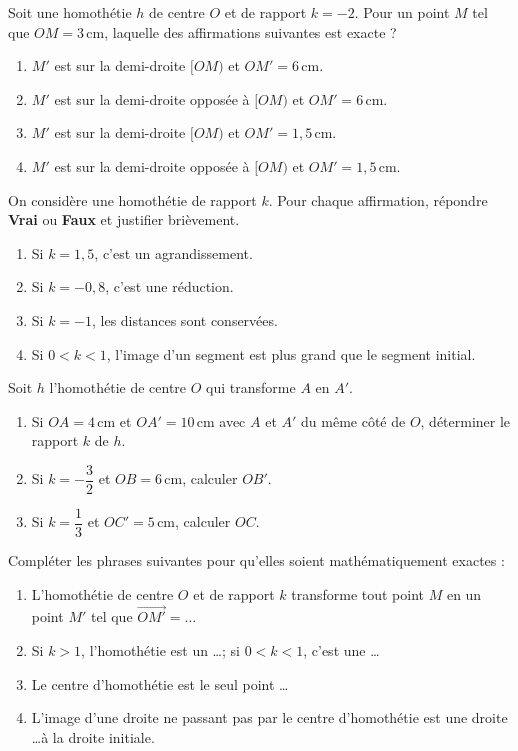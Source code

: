\documentclass[11pt]{article}
\newcounter{popsec}
\newcounter{popsub}
\newcommand{\courssub}[1]{%
  \stepcounter{popsub}%
  \par\vspace{9pt}\noindent{\popxbold\fontsize{11.5}{13}\selectfont\color{popink}{\color{poporange}\thepopsec.\thepopsub}\hspace{6pt}#1}\par\nopagebreak\vspace{4pt}
}
\begin{document}
\begin{exercice}
Soit une homothétie $h$ de centre $O$ et de rapport $k = -2$. Pour un point $M$ tel que $OM = 3\,\text{cm}$, laquelle des affirmations suivantes est exacte ?
\begin{enumerate}
\item $M'$ est sur la demi-droite $[OM)$ et $OM' = 6\,\text{cm}$.
\item $M'$ est sur la demi-droite opposée à $[OM)$ et $OM' = 6\,\text{cm}$.
\item $M'$ est sur la demi-droite $[OM)$ et $OM' = 1,5\,\text{cm}$.
\item $M'$ est sur la demi-droite opposée à $[OM)$ et $OM' = 1,5\,\text{cm}$.
\end{enumerate}
\end{exercice}
\begin{exercice}
On considère une homothétie de rapport $k$. Pour chaque affirmation, répondre \textbf{Vrai} ou \textbf{Faux} et justifier brièvement.
\begin{enumerate}
\item Si $k = 1,5$, c'est un agrandissement.
\item Si $k = -0,8$, c'est une réduction.
\item Si $k = -1$, les distances sont conservées.
\item Si $0 < k < 1$, l'image d'un segment est plus grand que le segment initial.
\end{enumerate}
\end{exercice}
\begin{exercice}
Soit $h$ l'homothétie de centre $O$ qui transforme $A$ en $A'$.
\begin{enumerate}
\item Si $OA = 4\,\text{cm}$ et $OA' = 10\,\text{cm}$ avec $A$ et $A'$ du même côté de $O$, déterminer le rapport $k$ de $h$.
\item Si $k = -\dfrac{3}{2}$ et $OB = 6\,\text{cm}$, calculer $OB'$.
\item Si $k = \dfrac{1}{3}$ et $OC' = 5\,\text{cm}$, calculer $OC$.
\end{enumerate}
\end{exercice}
\begin{exercice}
Compléter les phrases suivantes pour qu'elles soient mathématiquement exactes :
\begin{enumerate}
\item L'homothétie de centre $O$ et de rapport $k$ transforme tout point $M$ en un point $M'$ tel que $\overrightarrow{OM'} = \dots$
\item Si $k > 1$, l'homothétie est un \dots ; si $0 < k < 1$, c'est une \dots
\item Le centre d'homothétie est le seul point \dots
\item L'image d'une droite ne passant pas par le centre d'homothétie est une droite \dots à la droite initiale.
\end{enumerate}
\end{exercice}
\courssub{Je m'entraîne}
\end{document}
